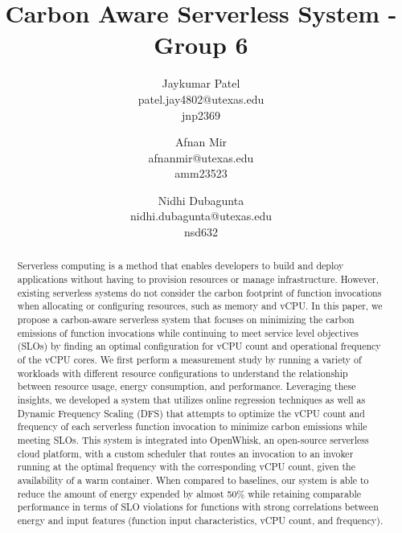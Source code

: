 \documentclass[times, 10pt,twocolumn]{article}
\begin{document}
\title{Carbon Aware Serverless System - Group 6}

\author{Jaykumar Patel\\
patel.jay4802@utexas.edu\\
jnp2369\\
\and
Afnan Mir\\
afnanmir@utexas.edu\\
amm23523\\
\and
Nidhi Dubagunta\\
nidhi.dubagunta@utexas.edu \\
nsd632\\
}



\maketitle
\thispagestyle{empty}

\begin{abstract}
   Serverless computing is a method that enables developers to build and deploy applications without having to provision resources or manage infrastructure. However, existing serverless systems do not consider the carbon footprint of function invocations when allocating or configuring resources, such as memory and vCPU. In this paper, we propose a carbon-aware serverless system that focuses on minimizing the carbon emissions of function invocations while continuing to meet service level objectives (SLOs) by finding an optimal configuration for vCPU count and operational frequency of the vCPU cores. We first perform a measurement study by running a variety of workloads with different resource configurations to understand the relationship between resource usage, energy consumption, and performance. Leveraging these insights, we developed a system that utilizes online regression techniques as well as Dynamic Frequency Scaling (DFS) that attempts to optimize 
   the vCPU count and frequency of each serverless function invocation to minimize carbon emissions while meeting SLOs. This system is integrated into OpenWhisk, an open-source serverless cloud platform, with a custom scheduler that routes an invocation to an invoker running at the optimal frequency with the corresponding vCPU count, given the availability of a warm container. When compared to baselines, our system is able to reduce the amount of energy expended by almost 50\% while retaining comparable performance in terms of SLO violations for functions with strong correlations between energy and input features (function input characteristics, vCPU count, and frequency).

\end{abstract}
\end{document}
